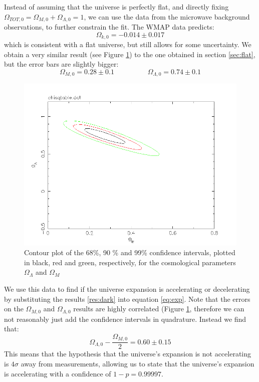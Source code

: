 \documentclass[11pt]{article}
\begin{document}
Instead of assuming that the universe is perfectly flat, and directly fixing $\Omega_{TOT,0} = \Omega_{M,0} + \Omega_{\Lambda,0} = 1$, we can use the data from the microwave background observations, to further constrain the fit. The WMAP data predicts:
\begin{equation}
	\Omega_{k,0} = -0.014 \pm 0.017
	\label{res:WMAP}
\end{equation}
which is consistent with a flat universe, but still allows for some uncertainty. We obtain a very similar result (see Figure \ref{fig:dark}) to the one obtained in section \ref{sec:flat}, but the error bars are slightly bigger: 
\begin{equation}
	\Omega_{M,0} = 0.28 \pm 0.1
	\hspace{2cm}
	\Omega_{\Lambda,0} = 0.74 \pm 0.1
	\label{res:dark}
\end{equation}
\begin{figure}[htbp]
	\centering
	\includegraphics[width=0.8\linewidth]{dark.png}
	\caption{Contour plot of the 68\%, 90 \% and 99\% confidence intervals, plotted in black, red and green, respectively, for the cosmological parameters $\Omega_\Lambda$ and $\Omega_M$}
	\label{fig:dark}
\end{figure}
We use this data to find if the universe expansion is accelerating or decelerating by substituting the results \eqref{res:dark} into equation \eqref{eq:exp}. Note that the errors on the $\Omega_{M,0}$ and $\Omega_{\Lambda,0}$ results are highly correlated (Figure \ref{fig:dark}, therefore we can not reasonably just add the confidence intervals in quadrature. Instead we find that: 
\begin{equation}
	\Omega_{\Lambda,0} - \frac{\Omega_{M,0}}{2} = 0.60 \pm 0.15
\end{equation}
This means that the hypothesis that the universe's expansion is not accelerating is $4 \sigma$ away from measurements, allowing us to state that the universe's expansion is accelerating with a confidence of $1-p = 0.99997$. 
\end{document}
